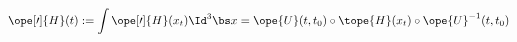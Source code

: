 \begin{equation}	\label{12.58}
\ope[\prime]{H}(t)
:=
\int \ope[\prime]{H}(x_t) \Id^3\bs x
=
\ope{U}(t,t_0) \circ \tope{H}(x_t)\circ \ope{U}^{-1}(t,t_0)
	\end{equation}

